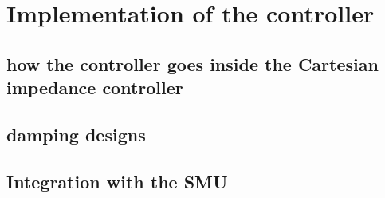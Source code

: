 \chapter{Implementation of the controller}
\label{section:implementation}

\section{how the controller goes inside the Cartesian impedance controller}

\section{damping designs}

\section{Integration with the SMU}



